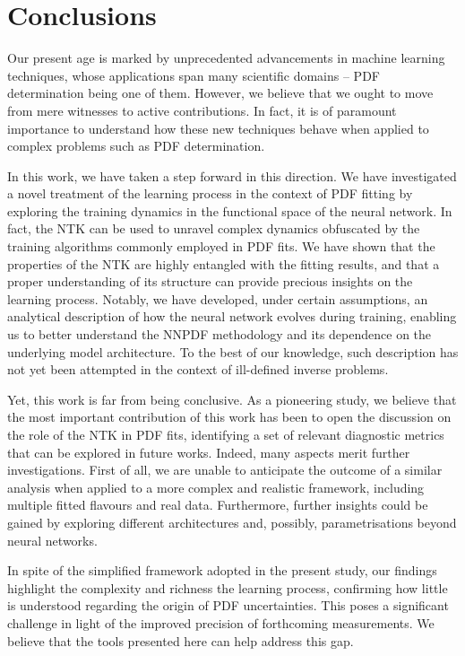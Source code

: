 \section{Conclusions}
\label{sec:conclusions}

Our present age is marked by unprecedented advancements in machine learning
techniques, whose applications span many scientific domains -- PDF determination
being one of them. However, we believe that we ought to move from mere witnesses
to active contributions. In fact, it is of paramount importance to understand
how these new techniques behave when applied to complex problems such as PDF
determination.

In this work, we have taken a step forward in this direction. We have
investigated a novel treatment of the learning process in the context of PDF
fitting by exploring the training dynamics in the functional space of the neural
network. In fact, the NTK can be used to unravel complex dynamics obfuscated by
the training algorithms commonly employed in PDF fits. We have shown that the
properties of the NTK are highly entangled with the fitting results, and that a
proper understanding of its structure can provide precious insights on the
learning process. Notably, we have developed, under certain assumptions, an
analytical description of how the neural network evolves during training,
enabling us to better understand the NNPDF methodology and its dependence on the
underlying model architecture. To the best of our knowledge, such description
has not yet been attempted in the context of ill-defined inverse problems.

Yet, this work is far from being conclusive. As a pioneering study, we believe
that the most important contribution of this work has been to open the
discussion on the role of the NTK in PDF fits, identifying a set of relevant
diagnostic metrics that can be explored in future works. Indeed, many aspects
merit further investigations. First of all, we are unable to anticipate the
outcome of a similar analysis when applied to a more complex and realistic
framework, including multiple fitted flavours and real data. Furthermore,
further insights could be gained by exploring different architectures and,
possibly, parametrisations beyond neural networks.

In spite of the simplified framework adopted in the present study, our findings
highlight the complexity and richness the learning process, confirming how
little is understood regarding the origin of PDF uncertainties. This poses a
significant challenge in light of the improved precision of forthcoming
measurements. We believe that the tools presented here can help address this
gap. 